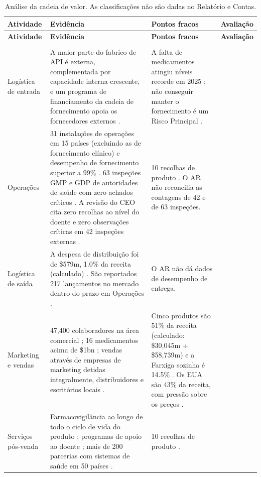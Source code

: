 \begin{xltabular}{\linewidth}{@{}N{2.45cm}YYp{2.45cm}@{}}
\caption{Análise da cadeia de valor. As classificações não são dadas no Relatório e Contas.}\label{tab:cadeia-valor}\\*
\toprule
\textbf{Atividade} & \textbf{Evidência} & \textbf{Pontos fracos} & \textbf{Avaliação} \\*
\midrule
\endfirsthead
\toprule
\textbf{Atividade} & \textbf{Evidência} & \textbf{Pontos fracos} & \textbf{Avaliação} \\*
\midrule
\endhead
\bottomrule
\endfoot
{} \\*
\midrule
Logística de entrada & A maior parte do fabrico de API é externa, complementada por capacidade interna crescente, e um programa de financiamento da cadeia de fornecimento apoia os fornecedores externos \cite[p.~33]{AR}. & A falta de medicamentos atingiu níveis recorde em 2025 \cite[p.~33]{AR}; não conseguir manter o fornecimento é um Risco Principal \cite[p.~48]{AR}. &  \\
Operações & 31 instalações de operações em 15 países (excluindo as de fornecimento clínico) e desempenho de fornecimento superior a 99\% \cite[pp.~4, 33]{AR}. 63 inspeções GMP e GDP de autoridades de saúde com zero achados críticos \cite[p.~31]{AR}. A revisão do CEO cita zero recolhas ao nível do doente e zero observações críticas em 42 inspeções externas \cite[p.~4]{AR}. & 10 recolhas de produto \cite[p.~31]{AR}. O AR não reconcilia as contagens de 42 e de 63 inspeções. &  \\
Logística de saída & A despesa de distribuição foi de \$579m, 1.0\% da receita (calculado) \cite[p.~125]{AR}. São reportados 217 lançamentos no mercado dentro do prazo em Operações \cite[pp.~27, 33]{AR}. & O AR não dá dados de desempenho de entrega. &  \\
Marketing e vendas & 47,400 colaboradores na área comercial \cite[p.~27]{AR}; 16 medicamentos acima de \$1bn \cite[p.~4]{AR}; vendas através de empresas de marketing detidas integralmente, distribuidores e escritórios locais \cite[p.~32]{AR}. & Cinco produtos são 51\% da receita (calculado: \$30,045m ÷ \$58,739m) e a Farxiga sozinha é 14.5\% \cite[p.~56]{AR}. Os EUA são 43\% da receita, com pressão sobre os preços \cite[pp.~2, 32]{AR}. &   \\
Serviços pós-venda & Farmacovigilância ao longo de todo o ciclo de vida do produto \cite[p.~31]{AR}; programas de apoio ao doente \cite[p.~41]{AR}; mais de 200 parcerias com sistemas de saúde em 50 países \cite[p.~4]{AR}. & 10 recolhas de produto \cite[p.~31]{AR}. &  \\

\end{xltabular}
